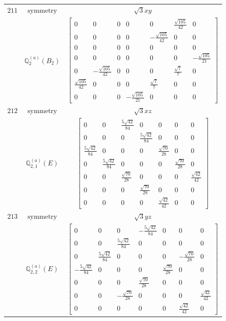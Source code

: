 \documentclass[fleqn,8pt,landscape]{jsarticle}
\begin{document}
\begin{longtable}{ccc}
$ 211 $ & $ \text{symmetry} $ & $ \sqrt{3} x y $ \\
$  $ & $ \mathbb{Q}_{2}^{(a)}(B_{2}) $ & $ \begin{bmatrix} 0 & 0 & 0 & 0 & 0 & \frac{\sqrt{105}}{42} & 0 \\ 0 & 0 & 0 & 0 & - \frac{\sqrt{105}}{42} & 0 & 0 \\ 0 & 0 & 0 & 0 & 0 & 0 & 0 \\ 0 & 0 & 0 & 0 & 0 & 0 & - \frac{\sqrt{105}}{21} \\ 0 & - \frac{\sqrt{105}}{42} & 0 & 0 & 0 & \frac{\sqrt{7}}{7} & 0 \\ \frac{\sqrt{105}}{42} & 0 & 0 & 0 & \frac{\sqrt{7}}{7} & 0 & 0 \\ 0 & 0 & 0 & - \frac{\sqrt{105}}{21} & 0 & 0 & 0 \end{bmatrix} $ \\ \hline
$ 212 $ & $ \text{symmetry} $ & $ \sqrt{3} x z $ \\
$  $ & $ \mathbb{Q}_{2,1}^{(a)}(E) $ & $ \begin{bmatrix} 0 & 0 & \frac{5 \sqrt{42}}{84} & 0 & 0 & 0 & 0 \\ 0 & 0 & 0 & \frac{5 \sqrt{42}}{84} & 0 & 0 & 0 \\ \frac{5 \sqrt{42}}{84} & 0 & 0 & 0 & \frac{\sqrt{70}}{28} & 0 & 0 \\ 0 & \frac{5 \sqrt{42}}{84} & 0 & 0 & 0 & \frac{\sqrt{70}}{28} & 0 \\ 0 & 0 & \frac{\sqrt{70}}{28} & 0 & 0 & 0 & \frac{\sqrt{42}}{42} \\ 0 & 0 & 0 & \frac{\sqrt{70}}{28} & 0 & 0 & 0 \\ 0 & 0 & 0 & 0 & \frac{\sqrt{42}}{42} & 0 & 0 \end{bmatrix} $ \\ \hline
$ 213 $ & $ \text{symmetry} $ & $ \sqrt{3} y z $ \\
$  $ & $ \mathbb{Q}_{2,2}^{(a)}(E) $ & $ \begin{bmatrix} 0 & 0 & 0 & - \frac{5 \sqrt{42}}{84} & 0 & 0 & 0 \\ 0 & 0 & \frac{5 \sqrt{42}}{84} & 0 & 0 & 0 & 0 \\ 0 & \frac{5 \sqrt{42}}{84} & 0 & 0 & 0 & - \frac{\sqrt{70}}{28} & 0 \\ - \frac{5 \sqrt{42}}{84} & 0 & 0 & 0 & \frac{\sqrt{70}}{28} & 0 & 0 \\ 0 & 0 & 0 & \frac{\sqrt{70}}{28} & 0 & 0 & 0 \\ 0 & 0 & - \frac{\sqrt{70}}{28} & 0 & 0 & 0 & \frac{\sqrt{42}}{42} \\ 0 & 0 & 0 & 0 & 0 & \frac{\sqrt{42}}{42} & 0 \end{bmatrix} $ \\ \hline

\end{longtable}
\end{document}
